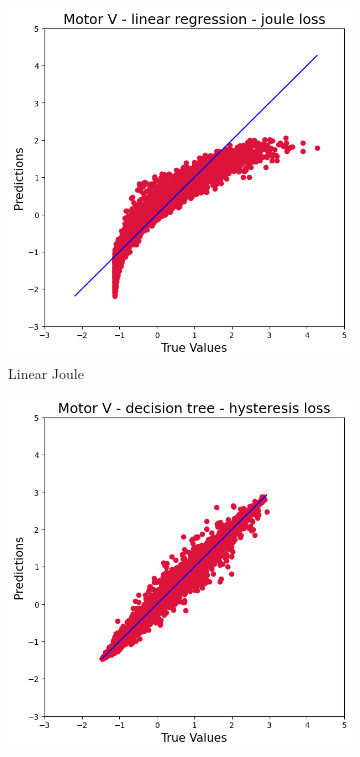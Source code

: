 \documentclass{article}
\begin{document}
\begin{figure}[!htbp]
\begin{subfigure}[b]{0.23\textwidth}
        \includegraphics[width=\textwidth]{images/V/linear_joule.png}
        \caption{Linear Joule}
    \end{subfigure}
    \hfill
    \begin{subfigure}[b]{0.23\textwidth}
        \centering
        \includegraphics[width=\textwidth]{images/V/reg_tree_hysteresis.png}

\end{subfigure}
\end{figure}
\end{document}

